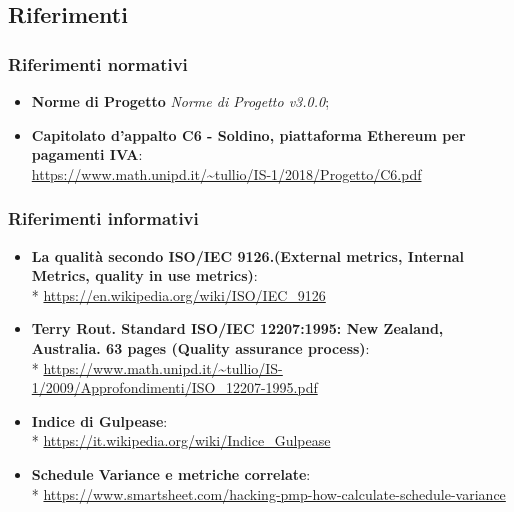 \subsection{Riferimenti}
\subsubsection{Riferimenti normativi}
\begin{itemize}
\item \textbf{Norme di Progetto} \textit{Norme di Progetto v3.0.0};
\item \textbf{Capitolato d'appalto C6 - Soldino, piattaforma Ethereum per pagamenti IVA}: \\ \url{https://www.math.unipd.it/~tullio/IS-1/2018/Progetto/C6.pdf}
\end{itemize}
\subsubsection{Riferimenti informativi}
\begin{itemize}
\item \textbf{La qualità secondo ISO/IEC 9126.(External metrics, Internal Metrics, quality in use metrics)}: \\* \url{https://en.wikipedia.org/wiki/ISO/IEC_9126}
\item \textbf{Terry Rout. Standard ISO/IEC 12207:1995: New Zealand, Australia. 63 pages (Quality assurance process)}:\\*  
\url{https://www.math.unipd.it/~tullio/IS-1/2009/Approfondimenti/ISO\_12207-1995.pdf}
\item \textbf{Indice di Gulpease}: \\* \url{https://it.wikipedia.org/wiki/Indice_Gulpease}
\item \textbf{Schedule Variance e metriche correlate}:\\* \url{https://www.smartsheet.com/hacking-pmp-how-calculate-schedule-variance}
\end{itemize}